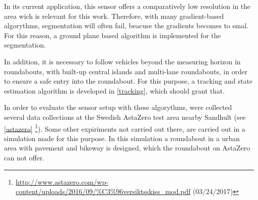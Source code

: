 \documentclass[11pt,oneside,openright]{mpreport}
\begin{document}

In its current application, this sensor offers a comparatively low resolution in the area wich is relevant for this work.
Therefore, with many gradient-based algorythms, segmentation will often fail, beacuse the gradients becomes to smal.
For this reason, a ground plane based algorithm is implemented for the segmentation.


In addition, it is necessary to follow vehicles beyond the measuring horizon in roundabouts, with built-up central islands and multi-lane roundabouts, 
in order to ensure a safe entry into the roundabout.
For this purpose, a tracking and state estimation algorithm is developed in \cref{tracking}, which should grant that.


In order to evaluate the sensor setup with these algorythms, were collected several data collections at the Swedish AstaZero test area nearby Sandhult (see \cref{astazero}
\footnote{\url{http://www.astazero.com/wp-content/uploads/2016/09/\%C3\%96versiktsskiss_mod.pdf} (03/24/2017)}).
Some other expiriments not carried out there, are carried out in a simulation made for this purpose. In this simulation a roundabout in a urban area 
with pavement and bikeway is designed, which the roundabout on AstaZero can not offer.
\end{document}
